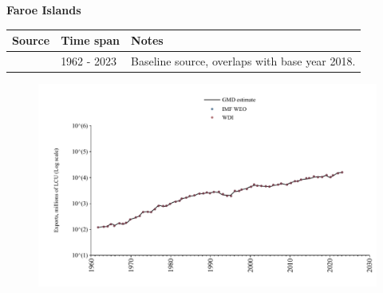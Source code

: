\documentclass[12pt,a4paper,landscape]{article}
\begin{document}
\begin{adjustbox}{max totalsize={\paperwidth}{\paperheight},center}
\begin{minipage}[t][\textheight][t]{\textwidth}
\vspace*{0.5cm}
{}
\begin{center}
{\Large\bfseries Faroe Islands}
\end{center}
\vspace{0.5cm}
\begin{table}[H]
\centering
\small
\begin{tabular}{|l|l|l|}
\hline
\textbf{Source} & \textbf{Time span} & \textbf{Notes} \\
\hline
\rowcolor{white}\cite{WDI}& 1962 - 2023 &Baseline source, overlaps with base year 2018.\\
\hline
\end{tabular}
\end{table}
\begin{figure}[H]
\centering
\includegraphics[width=\textwidth,height=0.6\textheight,keepaspectratio]{graphs/FRO_exports.pdf}
\end{figure}
\end{minipage}
\end{adjustbox}
\end{document}
